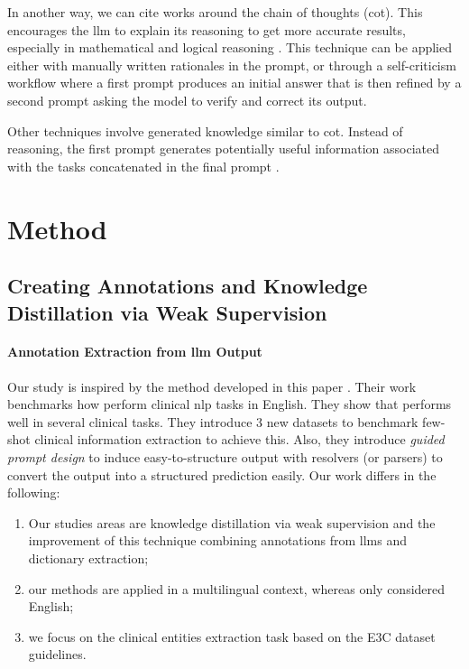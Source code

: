 In another way, we can cite works around the chain of thoughts (\gls{cot}). This encourages the \gls{llm} to explain its reasoning to get more accurate results, especially in mathematical and logical reasoning \citep{Wei2022ChainModels, Cobbe2021TrainingProblems}. This technique can be applied either with manually written rationales in the prompt, or through a self-criticism workflow where a first prompt produces an initial answer that is then refined by a second prompt asking the model to verify and correct its output.

Other techniques involve generated knowledge similar to \gls{cot}. Instead of reasoning, the first prompt generates potentially useful information associated with the tasks concatenated in the final prompt \citep{Liu2022GeneratedReasoning}.

\section{Method}

\subsection{Creating Annotations and Knowledge Distillation via Weak Supervision}
\paragraph{Annotation Extraction from \gls{llm} Output}
Our study is inspired by the method developed in this paper \citep{Agrawal2022LargeExtractors}. Their work benchmarks how \instruct \citep{ouyang2022training} perform clinical \gls{nlp} tasks in English. They show that \instruct performs well in several clinical tasks. They introduce 3 new datasets to benchmark few-shot clinical information extraction to achieve this. Also, they introduce \textit{guided prompt design} to induce easy-to-structure output with resolvers (or parsers) to convert the output into a structured prediction easily. 
Our work differs in the following: 
\begin{enumerate}
    \item Our studies areas are knowledge distillation via weak supervision and the improvement of this technique combining annotations from \glspl{llm} and dictionary extraction;
    \item our methods are applied in a multilingual context, whereas \citet{Agrawal2022LargeExtractors} only considered English;
    \item we focus on the clinical entities extraction task based on the E3C dataset guidelines.
\end{enumerate}


